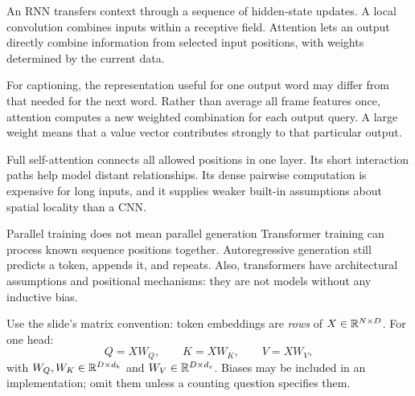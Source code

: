 \documentclass[11pt]{article}
\begin{document}
\tableofcontents\clearpage

An RNN transfers context through a sequence of hidden-state updates. A local convolution combines inputs within a receptive field. Attention lets an output directly combine information from selected input positions, with weights determined by the current data.

For captioning, the representation useful for one output word may differ from that needed for the next word. Rather than average all frame features once, attention computes a new weighted combination for each output query. A large weight means that a value vector contributes strongly to that particular output.

Full self-attention connects all allowed positions in one layer. Its short interaction paths help model distant relationships. Its dense pairwise computation is expensive for long inputs, and it supplies weaker built-in assumptions about spatial locality than a CNN.
\begin{careful}{Parallel training does not mean parallel generation}
Transformer training can process known sequence positions together. Autoregressive generation still predicts a token, appends it, and repeats. Also, transformers have architectural assumptions and positional mechanisms: they are not models without any inductive bias.
\end{careful}

Use the slide's matrix convention: token embeddings are \emph{rows} of $X\in\mathbb{R}^{N\times D}$. For one head:
\[
Q=XW_Q,\qquad K=XW_K,\qquad V=XW_V,
\]
with $W_Q,W_K\in\mathbb{R}^{D\times d_k}$ and $W_V\in\mathbb{R}^{D\times d_v}$. Biases may be included in an implementation; omit them unless a counting question specifies them.
\end{document}
